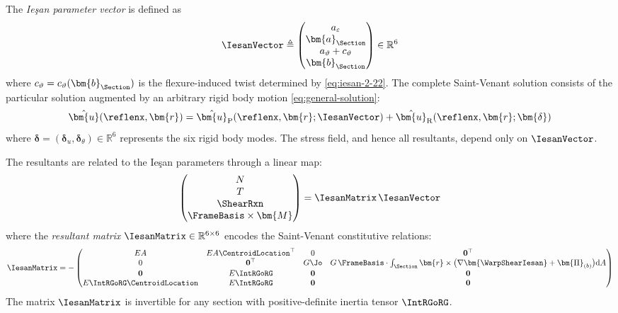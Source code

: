 \begin{Quote}

The \emph{Ieşan parameter vector} is defined as
\begin{equation}
\IesanVector \triangleq \begin{pmatrix} 
a_\varepsilon \\ \bm{a}_\Section \\ a_\vartheta + c_\vartheta \\ \bm{b}_\Section 
\end{pmatrix} \in \mathbb{R}^{6}
\end{equation}
where $c_\vartheta = c_\vartheta(\bm{b}_\Section)$ is the flexure-induced twist determined by \eqref{eq:iesan-2-22}. 
%
The complete Saint-Venant solution consists of the particular solution 
augmented by an arbitrary rigid body motion \eqref{eq:general-solution}:
\begin{equation*}
\hat{\bm{u}}(\reflenx, \bm{r}) = \hat{\bm{u}}_{\rm P}(\reflenx, \bm{r}; \IesanVector) 
+ \hat{\bm{u}}_{\rm R}(\reflenx, \bm{r}; \bm{\delta})
\end{equation*}
where $\bm{\delta} = (\bm{\delta}_u, \bm{\delta}_\theta) \in \mathbb{R}^6$ 
represents the six rigid body modes. The stress field, and hence all resultants, 
depend only on $\IesanVector$.

The resultants are related to the Ieşan parameters through a linear map:
\begin{equation}
\begin{pmatrix} N \\ T \\ \ShearRxn \\ \FrameBasis \times \bm{M} \end{pmatrix}
= \IesanMatrix \, \IesanVector
\end{equation}
where the \emph{resultant matrix} $\IesanMatrix \in \mathbb{R}^{6 \times 6}$ 
encodes the Saint-Venant constitutive relations:
\begin{equation}
\IesanMatrix = -\begin{pmatrix}
EA & EA\CentroidLocation^\top & 0 & \mathbf{0}^\top \\
0 & \mathbf{0}^\top & G\Jo & G\,\FrameBasis \cdot \int_\Section \bm{r} \times 
\big(\nabla\bm{\WarpShearIesan} + \bm{\Pi}_{(b)}\big) \mathrm{d}A \\
\mathbf{0} & E\IntRGoRG & \mathbf{0} & \mathbf{0} \\
E\IntRGoRG \CentroidLocation & E\IntRGoRG & \mathbf{0} & \mathbf{0}
\end{pmatrix}
\end{equation}
The matrix $\IesanMatrix$ is invertible for any section with positive-definite 
inertia tensor $\IntRGoRG$.
\end{Quote}

